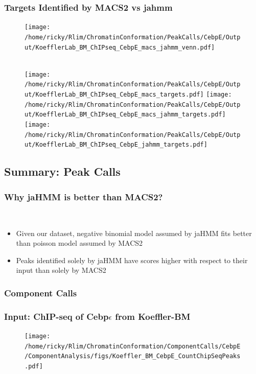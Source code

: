 \documentclass[notes]{beamer}
\begin{document}
\begin{frame}[plain]
    \frametitle{Targets Identified by MACS2 vs jahmm}
    \begin{figure}
        \begin{center}
            \texttt{[image: /home/ricky/Rlim/ChromatinConformation/PeakCalls/CebpE/Output/KoefflerLab\_BM\_ChIPseq\_CebpE\_macs\_jahmm\_venn.pdf]}
        \end{center}
        \\
        \texttt{[image: /home/ricky/Rlim/ChromatinConformation/PeakCalls/CebpE/Output/KoefflerLab\_BM\_ChIPseq\_CebpE\_macs\_targets.pdf]}
        \texttt{[image: /home/ricky/Rlim/ChromatinConformation/PeakCalls/CebpE/Output/KoefflerLab\_BM\_ChIPseq\_CebpE\_macs\_jahmm\_targets.pdf]}
        \texttt{[image: /home/ricky/Rlim/ChromatinConformation/PeakCalls/CebpE/Output/KoefflerLab\_BM\_ChIPseq\_CebpE\_jahmm\_targets.pdf]}
    \end{figure}
\end{frame}

\subsection{Summary: Peak Calls}
\begin{frame}
    \frametitle{Why jaHMM is better than MACS2?}\\
    \begin{itemize}[<+->]
        \item Given our dataset, negative binomial model assumed by jaHMM fits better than poisson model assumed by MACS2
        \item Peaks identified solely by jaHMM have scores higher with respect to their input than solely by MACS2  
    \end{itemize}
\end{frame}

\subsubsection{Component Calls}
\begin{frame}

\end{frame}

\begin{frame}
    \frametitle{Input: ChIP-seq of Cebp$\epsilon$ from Koeffler-BM}
    \begin{figure}
        \texttt{[image: /home/ricky/Rlim/ChromatinConformation/ComponentCalls/CebpE/ComponentAnalysis/figs/Koeffler\_BM\_CebpE\_CountChipSeqPeaks.pdf]}
    \end{figure}
\end{frame}
\end{document}
